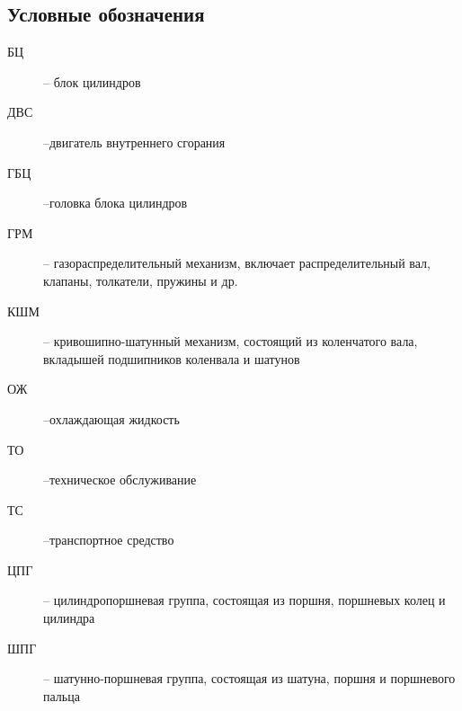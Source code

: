 \subsection{Условные обозначения}
%
\begin{description}
%	 
\item
[БЦ] -- блок цилиндров
\item
[ДВС] --двигатель внутреннего сгорания
\item
[ГБЦ] --головка блока цилиндров
\item
[ГРМ] -- газораспределительный механизм, включает распределительный вал,
клапаны, толкатели, пружины и др.
\item
[КШМ] -- кривошипно-шатунный механизм, состоящий из коленчатого вала,
вкладышей подшипников коленвала и шатунов
\item
[ОЖ] --охлаждающая жидкость 
\item
[ТО] --техническое обслуживание
\item
[ТС] --транспортное средство
\item
[ЦПГ] -- цилиндропоршневая группа, состоящая из поршня, поршневых колец и
цилиндра
\item
[ШПГ] -- шатунно-поршневая группа, состоящая из шатуна, поршня и поршневого
пальца
%
\end{description}

